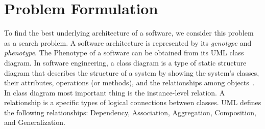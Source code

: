 \documentclass[letterpaper, 10 pt, conference]{ieeeconf}  %
\begin{document}





\section{Problem Formulation}
To find the best underlying architecture of a software, we consider this problem as a search problem. A software architecture is represented by its \textit{genotype} and \textit{phenotype}. The Phenotype of a software can be obtained from its UML class diagram. In software engineering, a class diagram  is a type of static structure diagram that describes the structure of a system by showing the system's classes, their attributes, operations (or methods), and the relationships among objects~\cite{ambler2003uml}. In  class diagram most important thing is the instance-level relation. A relationship is a specific types of logical connections between classes. UML defines the following relationships: Dependency, Association, Aggregation, Composition, and Generalization.\\
\end{document}

